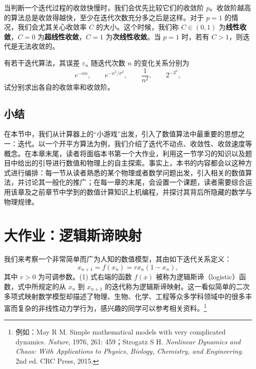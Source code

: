 当判断一个迭代过程的收敛快慢时，我们会优先比较它们的收敛阶 $p$。收敛阶越高的算法总是收敛得越快，至少在迭代次数充分多之后是这样。对于 $p=1$ 的情况，我们会尤其关心收敛率 $C$ 的大小。这个时候，我们称 $C\in(0,1)$ 为\textbf{线性收敛}，$C=0$ 为\textbf{超线性收敛}，$C=1$ 为\textbf{次线性收敛}。当 $p=1$ 时，若有 $C>1$，则迭代是无法收敛的。

\begin{exerciseBox}[练习 1.4]
有若干迭代算法，其误差 $\varepsilon_n$ 随迭代次数 $n$ 的变化关系分别为
\[
 e^{-\alpha n},\qquad e^{-n^2/\sigma^2},\qquad \frac{1}{n^2},\qquad 2^{-3^n},
\]
试分别求出各自的收敛率和收敛阶。
\end{exerciseBox}

\subsection{小结}

在本节中，我们从计算器上的“小游戏”出发，引入了数值算法中最重要的思想之一：迭代。以一个开平方算法为例，我们介绍了迭代不动点、收敛性、收敛速度等概念。在本章末尾，读者将面临本书第一个大作业，利用这一节学习的知识以及题目中给出的引导进行数值和物理上的自主探索。事实上，本书的内容都会以这种方式进行编排：每一节从读者熟悉的某个物理或者数学问题出发，引入相关的数值算法，并讨论其一般化的推广；在每一章的末尾，会设置一个课题，读者需要综合运用该章及之前章节中学到的数值计算知识上机编程，并探讨其背后所隐藏的数学与物理规律。

\section*{大作业：逻辑斯谛映射}

我们来考察一个非常简单而广为人知的数值模型，其由如下迭代关系定义：
\begin{equation}
 x_{n+1}=f(x_n)=r x_n(1-x_n),
\tag{1}
\end{equation}
其中 $r>0$ 为可调参数。(1) 式右端的函数 $f(x)$ 被称为逻辑斯谛（logistic）函数，式中所规定的从 $x_n$ 到 $x_{n+1}$ 的迭代称为逻辑斯谛映射。这一看似简单的二次多项式映射数学模型却描述了物理、生物、化学、工程等众多学科领域中的很多丰富而复杂的非线性动力学行为，感兴趣的同学可以参考相关资料。\footnote{例如：May R M. Simple mathematical models with very complicated dynamics. \textit{Nature}, 1976, 261: 459；Strogatz S H. \textit{Nonlinear Dynamics and Chaos: With Applications to Physics, Biology, Chemistry, and Engineering}. 2nd ed. CRC Press, 2015.}

